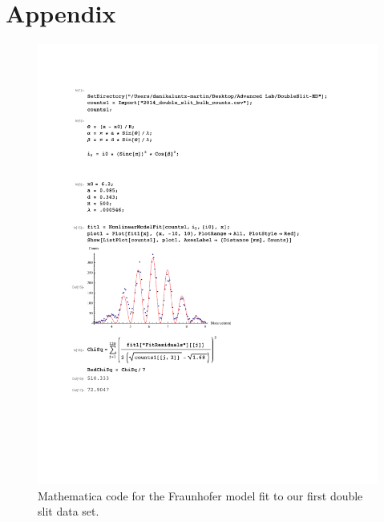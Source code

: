 \documentclass[prb,preprint]{revtex4-1}
\begin{document}
\section{Appendix}

\begin{figure}[h!]
\centering
\includegraphics[width=6in]{DoubleSlitFraun1.pdf}
\caption{Mathematica code for the Fraunhofer model fit to our first double slit data set.}
\label{DoubleSlitFraun1}
\end{figure}
\end{document}
